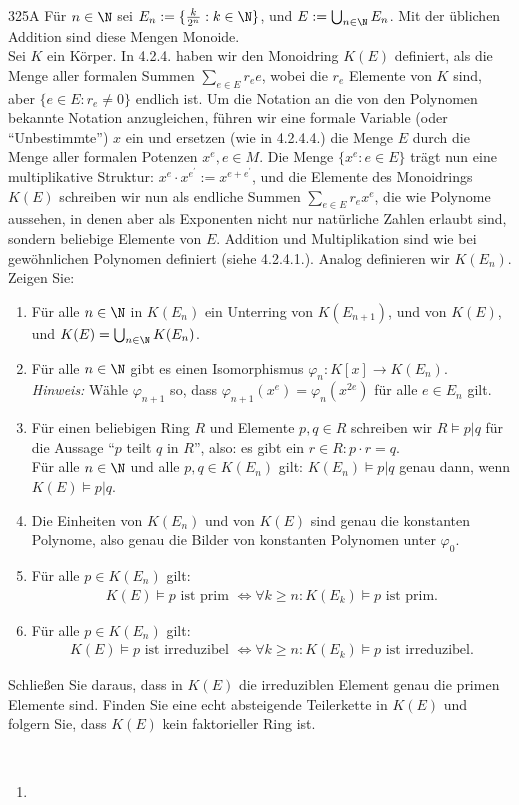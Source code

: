 \begin{algebraUE}{325A}
Für $n \in \N$ sei $E_n := \{\frac{k}{2^n}: k \in \N\}$, und $E := \bigcup_{n \in \N}E_n$.
Mit der üblichen Addition sind diese Mengen Monoide. \\
Sei $K$ ein Körper. In 4.2.4. haben wir den Monoidring $K(E)$ definiert, als die
Menge aller formalen Summen $\sum_{e \in E}r_ee$, wobei die $r_e$ Elemente von $K$
sind, aber $\{e \in E: r_e \neq 0\}$ endlich ist. Um die Notation an die von den
Polynomen bekannte Notation anzugleichen, führen wir eine formale Variable
(oder ``Unbestimmte'') $x$ ein und ersetzen (wie in 4.2.4.4.) die Menge $E$
durch die Menge aller formalen Potenzen $x^e,e \in M$. Die Menge $\{x^e : e \in E\}$
trägt nun eine multiplikative Struktur: $x^e\cdot x^{e^{\prime}} := x^{e+e^{\prime}}$,
und die Elemente des Monoidrings $K(E)$ schreiben wir nun als endliche Summen
$\sum_{e \in E}r_e x^e$, die wie Polynome aussehen, in denen aber als Exponenten
nicht nur natürliche Zahlen erlaubt sind, sondern beliebige Elemente von $E$.
Addition und Multiplikation sind wie bei gewöhnlichen Polynomen definiert
(siehe 4.2.4.1.). Analog definieren wir $K(E_n)$. Zeigen Sie:
\begin{enumerate}
  \item Für alle $n \in \N$ in $K(E_n)$ ein Unterring von $K(E_{n+1})$, und von
  $K(E)$, und $K(E) = \bigcup_{n \in \N}K(E_n)$.
  \item Für alle $n \in \N$ gibt es einen Isomorphismus $\varphi_n: K[x] \to K(E_n)$. \\
  \textit{Hinweis:} Wähle $\varphi_{n+1}$ so, dass $\varphi_{n+1}(x^e) = \varphi_{n}(x^{2e})$
  für alle $e \in E_n$ gilt.
  \item Für einen beliebigen Ring $R$ und Elemente $p,q \in R$ schreiben wir $R \vDash p|q$
  für die Aussage ``$p$ teilt $q$ in $R$'', also: es gibt ein $r \in R: p\cdot r = q$. \\
  Für alle $n \in \N$ und alle $p,q \in K(E_n)$ gilt: $K(E_n) \vDash p|q$
  genau dann, wenn $K(E) \vDash p|q$.
  \item Die Einheiten von $K(E_n)$ und von $K(E)$ sind genau die konstanten Polynome,
  also genau die Bilder von konstanten Polynomen unter $\varphi_0$.
  \item Für alle $p \in K(E_n)$ gilt:
  \begin{align*}
    K(E) \vDash p \text{ ist prim } \iff \forall k \geq n: K(E_k) \vDash p \text{ ist prim}.
  \end{align*}
  \item Für alle $p \in K(E_n)$ gilt:
  \begin{align*}
    K(E) \vDash p \text{ ist irreduzibel } \iff \forall k \geq n: K(E_k) \vDash p \text{ ist irreduzibel}.
  \end{align*}
\end{enumerate}
Schließen Sie daraus, dass in $K(E)$ die irreduziblen Element genau die primen Elemente sind.
Finden Sie eine echt absteigende Teilerkette in $K(E)$ und folgern Sie, dass $K(E)$
kein faktorieller Ring ist.
\end{algebraUE}
\begin{solution}
\leavevmode \\
\begin{enumerate}
  \item
\end{enumerate}
\end{solution}
